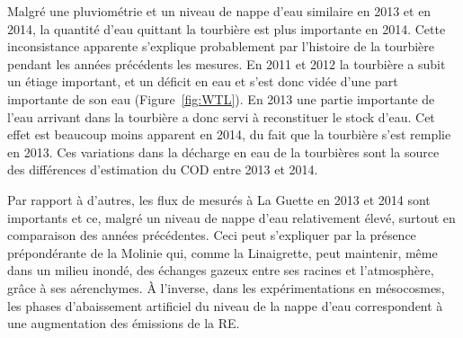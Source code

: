 

Malgré une pluviométrie et un niveau de nappe d'eau similaire en 2013 et en 2014, la quantité d'eau quittant la tourbière est plus importante en 2014.
Cette inconsistance apparente s'explique probablement par l'histoire de la tourbière pendant les années précédents les mesures.
En 2011 et 2012 la tourbière a subit un étiage important, et un déficit en eau et s'est donc vidée d'une part importante de son eau (Figure~\ref{fig:WTL}).
En 2013 une partie importante de l'eau arrivant dans la tourbière a donc servi à reconstituer le stock d'eau.
Cet effet est beaucoup moins apparent en 2014, du fait que la tourbière s'est remplie en 2013.
Ces variations dans la décharge en eau de la tourbières sont la source des différences d'estimation du COD entre 2013 et 2014.

Par rapport à d'autres, les flux de \coo mesurés à La Guette en 2013 et 2014 sont importants et ce, malgré un niveau de nappe d'eau relativement élevé, surtout en comparaison des années précédentes.
Ceci peut s'expliquer par la présence prépondérante de la Molinie qui, comme la Linaigrette, peut maintenir, même dans un milieu inondé, des échanges gazeux entre ses racines et l'atmosphère, grâce à ses aérenchymes.
À l'inverse, dans les expérimentations en mésocosmes, les phases d'abaissement artificiel du niveau de la nappe d'eau correspondent à une augmentation des émissions de la RE.

